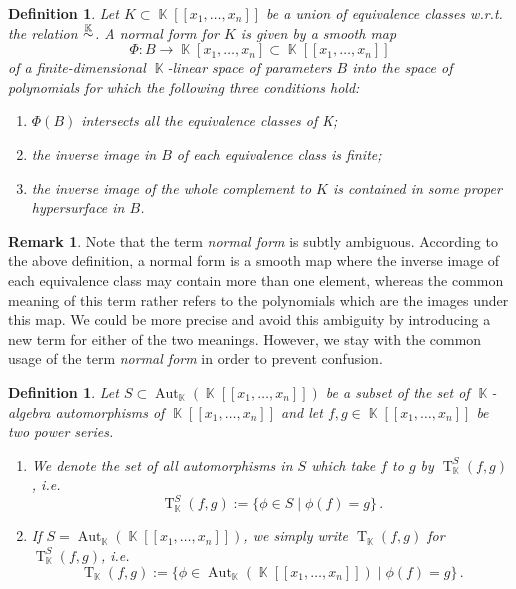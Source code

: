 \documentclass{amsproc}
\newtheorem{defn}[theorem]{Definition}
\theoremstyle{definition}
\newtheorem{remark}[theorem]{Remark}
\DeclareMathOperator{\K}{\mathbb{K}}
\DeclareMathOperator{\T}{T}
\DeclareMathOperator{\Aut}{Aut}
\newcommand{\ksim}{\ensuremath{\mathrel{%
  \raisebox{0pt}[\heightof{$\overset{\scriptscriptstyle\K}{\sim}$}]{%
    $\overset{\K}{\sim}$%
  }%
}}}
\begin{document}
\begin{defn}
Let $K \subset \K[[x_1,\ldots,x_n]]$ be a union of equivalence classes w.r.t.\@
the relation $\ksim$. A \emph{normal form} for $K$ is given by a smooth map
\[
\Phi: B \longrightarrow \K[x_1,\ldots,x_n] \subset \K[[x_1,\ldots,x_n]]
\]
of a finite-dimensional $\K$-linear \emph{space of parameters} $B$ into the
space of polynomials for which the following three conditions hold:

\begin{enumerate}
\item $\Phi(B)$ intersects all the equivalence classes of K;

\item the inverse image in $B$ of each equivalence class is finite;

\item the inverse image of the whole complement to $K$ is contained in some
proper hypersurface in $B$.
\end{enumerate}
\end{defn}

\begin{remark}
Note that the term \emph{normal form} is subtly ambiguous. According to the
above definition, a normal form is a smooth map where the inverse image of each
equivalence class may contain more than one element, whereas the common meaning
of this term rather refers to the polynomials which are the images under this
map. We could be more precise
and avoid this ambiguity by introducing a new term for either of the two
meanings. However, we stay with the common usage of the term \emph{normal form}
in order to prevent confusion.
\end{remark}

\begin{defn}
Let $S \subset \Aut_{\K}(\K[[x_1,\ldots,x_n]])$ be a subset of the set of
$\K$-algebra automorphisms of $\K[[x_1, \ldots, x_n]]$ and let
$f, g \in \K[[x_1, \ldots, x_n]]$ be two power series.
\begin{enumerate}
\item We denote the set of all automorphisms in $S$ which take $f$ to $g$ by
$\T_{\K}^S(f,g)$, i.e.\@
\[
\T_{\K}^S(f,g):=\{\phi\in S\mid \phi(f)=g\}\,.
\]

\item If $S=\Aut_{\K}(\K[[x_1,\ldots,x_n]])$, we simply write
$\T_{\K}(f,g)$ for $\T_{\K}^S(f,g)$, i.e.\@
\[
\T_{\K}(f,g)
:= \{\phi \in \Aut_{\K}(\K[[x_1, \ldots, x_n]]) \mid \phi(f) = g \} \,.
\]
\end{enumerate}
\end{defn}
\end{document}
